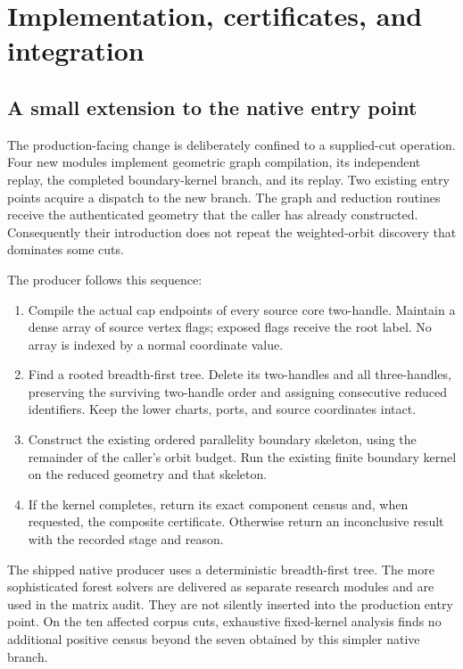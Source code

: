 \section{Implementation, certificates, and integration}
\label{sec:implementation}

\subsection{A small extension to the native entry point}
The production-facing change is deliberately confined to a supplied-cut
operation.  Four new modules implement geometric graph compilation, its
independent replay, the completed boundary-kernel branch, and its replay.
Two existing entry points acquire a dispatch to the new branch.  The graph
and reduction routines receive the authenticated geometry that the caller
has already constructed.  Consequently their introduction does not repeat
the weighted-orbit discovery that dominates some cuts.

The producer follows this sequence:
\begin{enumerate}
\item Compile the actual cap endpoints of every source core two-handle.
  Maintain a dense array of source vertex flags; exposed flags receive
  the root label.  No array is indexed by a normal coordinate value.
\item Find a rooted breadth-first tree.  Delete its two-handles and all
  three-handles, preserving the surviving two-handle order and assigning
  consecutive reduced identifiers.  Keep the lower charts, ports, and
  source coordinates intact.
\item Construct the existing ordered parallelity boundary skeleton, using
  the remainder of the caller's orbit budget.  Run the existing finite
  boundary kernel on the reduced geometry and that skeleton.
\item If the kernel completes, return its exact component census and, when
  requested, the composite certificate.  Otherwise return an inconclusive
  result with the recorded stage and reason.
\end{enumerate}
The shipped native producer uses a deterministic breadth-first tree.  The
more sophisticated forest solvers are delivered as separate research
modules and are used in the matrix audit.  They are not silently inserted
into the production entry point.  On the ten affected corpus cuts, exhaustive
fixed-kernel analysis finds no additional positive census beyond the seven
obtained by this simpler native branch.

